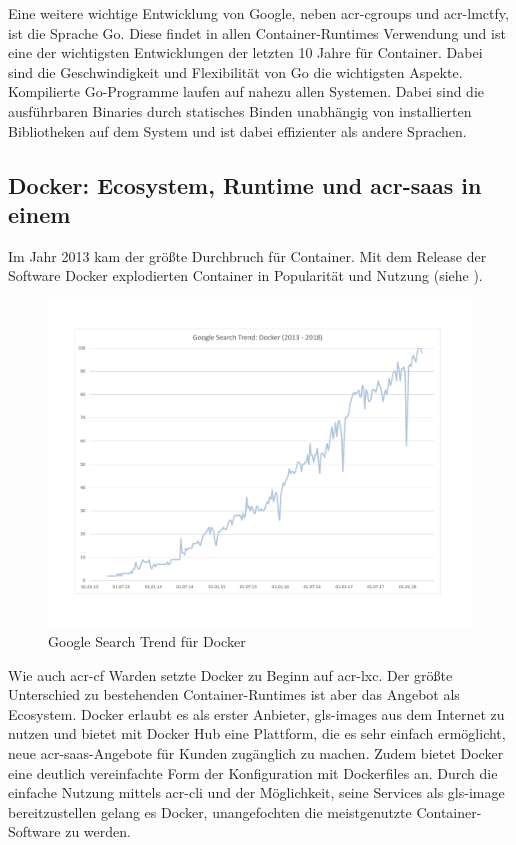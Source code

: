 Eine weitere wichtige Entwicklung von Google, neben \glspl{acr-cgroup} und \gls{acr-lmctfy}, ist die Sprache Go. Diese findet in allen Container-Runtimes Verwendung und ist eine der wichtigsten Entwicklungen der letzten 10 Jahre für Container. Dabei sind die Geschwindigkeit und Flexibilität von Go die wichtigsten Aspekte. Kompilierte Go-Programme laufen auf nahezu allen Systemen. Dabei sind die ausführbaren Binaries durch statisches Binden unabhängig von installierten Bibliotheken auf dem System und ist dabei effizienter als andere Sprachen.

\subsection{Docker: Ecosystem, Runtime und \gls{acr-saas} in einem}
\label{sec:geschichteDocker}
Im Jahr 2013 kam der größte Durchbruch für Container. Mit dem Release der Software Docker explodierten Container in Popularität und Nutzung (siehe ).

\begin{figure}[h]
	\begin{center}
		\includegraphics[width=\textwidth]{bilder/google-search-docker.pdf}
		\caption{Google Search Trend für Docker \citep{DockerErkundenGoogleTrends}}
		\label{fig:googleDocker}
	\end{center}
\end{figure}

Wie auch \gls{acr-cf} Warden setzte Docker zu Beginn auf \gls{acr-lxc}. Der größte Unterschied zu bestehenden Container-Runtimes ist aber das Angebot als Ecosystem. Docker erlaubt es als erster Anbieter, \glspl{gls-image} aus dem Internet zu nutzen und bietet mit Docker Hub eine Plattform, die es sehr einfach ermöglicht, neue \gls{acr-saas}-Angebote für Kunden zugänglich zu machen. Zudem bietet Docker eine deutlich vereinfachte Form der Konfiguration mit Dockerfiles an. Durch die einfache Nutzung mittels \gls{acr-cli} und der Möglichkeit, seine Services als \gls{gls-image} bereitzustellen gelang es Docker, unangefochten die meistgenutzte Container-Software zu werden.


